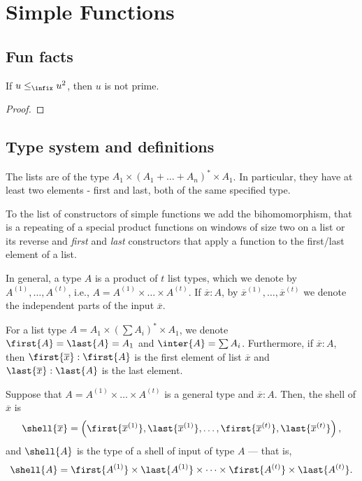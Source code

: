 \section{Simple Functions}

\subsection{Fun facts}

\begin{lemma}\label{lem:prime-words-must-perfectly-align}
    If $u \leq_\infix u^2$, then $u$ is not prime.
\end{lemma}

\begin{proof}
\end{proof}

\subsection{Type system and definitions}


The lists are of the type $A_1 \times (A_1 + \dots + A_n )^* \times A_1 $. In particular, they have at least two elements - first and last, both of the same specified type.

To the list of constructors of simple functions we add the bihomomorphism, that is a repeating of a special product functions on windows of size two on a list or its reverse and \emph{first} and \emph{last} constructors that apply a function to the first/last element of a list.

In general, a type $A$ is a product of $t$ list types, which we denote by $A^{(1)}, \dots, A^{(t)}$, i.e., $A = A^{(1)} \times \dots \times A^{(t)}$. If $\overline x : A$, by $\overline x^{(1)}, \dots, \overline x^{(t)}$ we denote the independent parts of the input $\overline x$.

For a list type $A = A_1 \times (\sum A_i)^* \times A_1$, we denote $\first{A} = \last{A} = A_1$ and $\inter{A} = \sum A_i$. Furthermore, if $\overline x : A$, then $\first{\overline x} : \first{A}$ is the first element of list $\overline x$ and $\last{\overline x} : \last{A}$ is the last element.

\begin{definition}[Shell]
    Suppose that $A = A^{(1)} \times \dots \times A^{(t)}$ is a general type and $\overline x : A$. Then, the shell of $\overline x$ is
    \[
        \shell{\overline x} = \left(\first{\overline x^{(1)}}, \last{\overline x^{(1)}}, \dots, \first{\overline x^{(t)}}, \last{\overline x^{(t)}} \right),
    \]
    and $\shell{A}$ is the type of a shell of input of type $A$ --- that is, 
    \[
        \shell{A} = \first{A^{(1)}} \times \last{A^{(1)}} \times \dots \times \first{A^{(t)}} \times \last{A^{(t)}}.
    \]
\end{definition}

